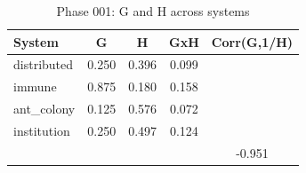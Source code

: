 \begin{table}[htbp]
\centering
\caption{Phase 001: G and H across systems}
\begin{tabular}{lcccc}
\hline
System & G & H & GxH & Corr(G,1/H) \\
\hline
distributed & 0.250 & 0.396 & 0.099 &  \\
immune & 0.875 & 0.180 & 0.158 &  \\
ant_colony & 0.125 & 0.576 & 0.072 &  \\
institution & 0.250 & 0.497 & 0.124 &  \\
 &  &  &  & -0.951 \\
\hline
\end{tabular}
\end{table}

